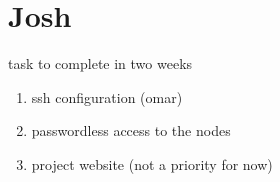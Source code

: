 \section{Josh}
task to complete in two weeks


\begin{enumerate}
\item ssh configuration (omar)
\item passwordless access to the nodes 
\item project website (not a priority for now) 
\end{enumerate}